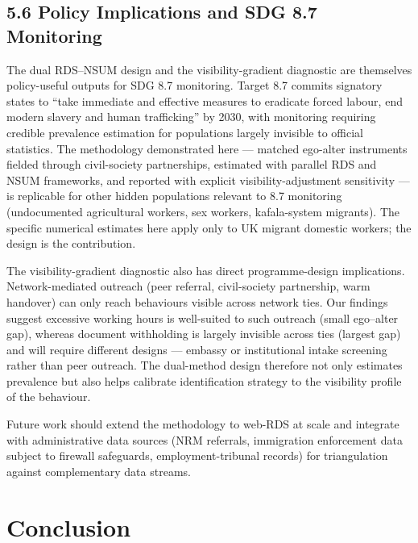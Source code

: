 \documentclass[
  12pt,
  letterpaper,
  DIV=11,
  numbers=noendperiod]{scrartcl}
\begin{document}
\subsection{5.6 Policy Implications and SDG 8.7
Monitoring}\label{sec-policy}

The dual RDS--NSUM design and the visibility-gradient diagnostic are
themselves policy-useful outputs for SDG 8.7 monitoring. Target 8.7
commits signatory states to ``take immediate and effective measures to
eradicate forced labour, end modern slavery and human trafficking'' by
2030, with monitoring requiring credible prevalence estimation for
populations largely invisible to official statistics. The methodology
demonstrated here --- matched ego-alter instruments fielded through
civil-society partnerships, estimated with parallel RDS and NSUM
frameworks, and reported with explicit visibility-adjustment sensitivity
--- is replicable for other hidden populations relevant to 8.7
monitoring (undocumented agricultural workers, sex workers,
kafala-system migrants). The specific numerical estimates here apply
only to UK migrant domestic workers; the design is the contribution.

The visibility-gradient diagnostic also has direct programme-design
implications. Network-mediated outreach (peer referral, civil-society
partnership, warm handover) can only reach behaviours visible across
network ties. Our findings suggest excessive working hours is
well-suited to such outreach (small ego--alter gap), whereas document
withholding is largely invisible across ties (largest gap) and will
require different designs --- embassy or institutional intake screening
rather than peer outreach. The dual-method design therefore not only
estimates prevalence but also helps calibrate identification strategy to
the visibility profile of the behaviour.

Future work should extend the methodology to web-RDS at scale and
integrate with administrative data sources (NRM referrals, immigration
enforcement data subject to firewall safeguards, employment-tribunal
records) for triangulation against complementary data streams.

\section{Conclusion}\label{sec-conclusion}
\end{document}
